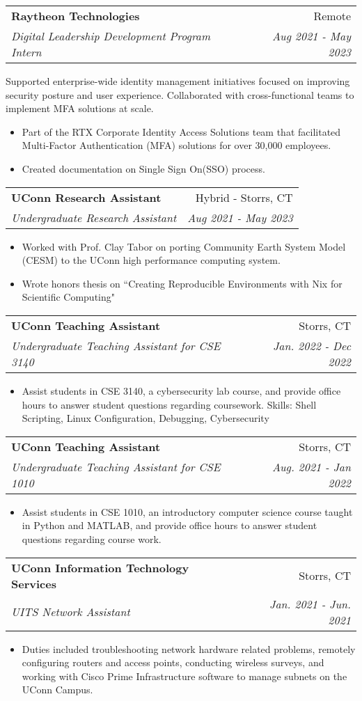 \documentclass[a4paper,11pt]{article}
\makeatletter
\newcommand{\resumeItemCustom}[2]{
  \item\small{
    \textbf{#1}{ #2 \vspace{-2pt}}
  }
}
\newcommand{\resumeSubheading}[4]{
  \vspace{-1pt}\item
    \begin{tabular*}{0.97\textwidth}{l@{\extracolsep{\fill}}r}
      \textbf{#1} & #2 \\
      \textit{#3} & \textit{#4} \\
    \end{tabular*}\vspace{-5pt}
}
\newcommand{\resumeItemListStart}{\begin{itemize}}
\newcommand{\resumeItemListEnd}{\end{itemize}\vspace{-5pt}}
\makeatother
\begin{document}
\vspace{2pt}
    \resumeSubheading{Raytheon Technologies}{Remote}
    {Digital Leadership Development Program Intern}{Aug 2021 - May 2023}
    
    Supported enterprise-wide identity management initiatives focused on improving security posture and user experience. Collaborated with cross-functional teams to implement MFA solutions at scale.
    \vspace{-3pt}
    \resumeItemListStart
    \resumeItemCustom{}{Part of the RTX Corporate Identity Access Solutions team that facilitated Multi-Factor Authentication (MFA) solutions for over 30,000 employees.}
    \resumeItemCustom{}{Created documentation on Single Sign On(SSO) process.}
    \resumeItemListEnd
    
\vspace{2pt}
    \resumeSubheading{UConn Research Assistant}{Hybrid - Storrs, CT}
    {Undergraduate Research Assistant}{Aug 2021 - May 2023}
    \resumeItemListStart
    \resumeItemCustom{}{Worked with Prof. Clay Tabor on porting Community Earth System Model (CESM) to the UConn high performance computing system.}
    \resumeItemCustom{}{Wrote honors thesis on ``Creating Reproducible Environments with Nix for Scientific Computing"}
    \resumeItemListEnd
    
\vspace{2pt}
    \resumeSubheading{UConn Teaching Assistant}{Storrs, CT}
    {Undergraduate Teaching Assistant for CSE 3140}{Jan. 2022 - Dec 2022}
    \resumeItemListStart
    \resumeItemCustom{}{Assist students in CSE 3140, a cybersecurity lab course, and provide office hours to answer student questions regarding coursework. Skills: Shell Scripting, Linux Configuration, Debugging, Cybersecurity}
    \resumeItemListEnd
    
\vspace{2pt}
    \resumeSubheading{UConn Teaching Assistant}{Storrs, CT}
    {Undergraduate Teaching Assistant for CSE 1010}{Aug. 2021 - Jan 2022}
    \resumeItemListStart
    \resumeItemCustom{}{Assist students in CSE 1010, an introductory computer science course taught in Python and MATLAB, and provide office hours to answer student questions regarding course work.}
    \resumeItemListEnd
    
\vspace{2pt}
    \resumeSubheading
		{UConn Information Technology Services}{Storrs, CT}
		{UITS Network Assistant}{ Jan. 2021 - Jun. 2021}
		\resumeItemListStart
        \resumeItemCustom{}{Duties included troubleshooting network hardware related problems, remotely configuring routers and access points, conducting wireless surveys, and working with Cisco Prime Infrastructure software to manage subnets on the UConn Campus.}
		\resumeItemListEnd
\end{document}
